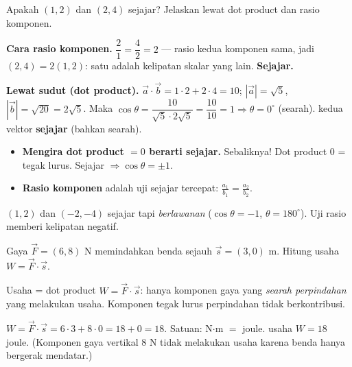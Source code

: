 \begin{soalbox}{}
Apakah $(1,2)$ dan $(2,4)$ sejajar? Jelaskan lewat dot product dan rasio
komponen.
\end{soalbox}

\jawab
\textbf{Cara rasio komponen.} $\dfrac{2}{1}=\dfrac{4}{2}=2$ --- rasio kedua
komponen sama, jadi $(2,4)=2(1,2)$: satu adalah kelipatan skalar yang lain.
\textbf{Sejajar.}

\textbf{Lewat sudut (dot product).} $\vec a\cdot\vec b=1\cdot2+2\cdot4=10$;
$|\vec a|=\sqrt5$, $|\vec b|=\sqrt{20}=2\sqrt5$. Maka
$\cos\theta=\dfrac{10}{\sqrt5\cdot2\sqrt5}=\dfrac{10}{10}=1\Rightarrow\theta=0^\circ$
(searah).
\jadi kedua vektor \textbf{sejajar} (bahkan searah).

\begin{jebakan}
\begin{itemize}[leftmargin=*,topsep=2pt]
  \item \textbf{Mengira dot product $=0$ berarti sejajar.} Sebaliknya! Dot
  product $0$ = tegak lurus. Sejajar $\Rightarrow\cos\theta=\pm1$.
  \item \textbf{Rasio komponen} adalah uji sejajar tercepat: $\frac{a_1}{b_1}
  =\frac{a_2}{b_2}$.
\end{itemize}
\end{jebakan}

\begin{variasi}
$(1,2)$ dan $(-2,-4)$ sejajar tapi \emph{berlawanan} ($\cos\theta=-1$,
$\theta=180^\circ$). Uji rasio memberi kelipatan negatif.
\end{variasi}

\begin{soalbox}{}
Gaya $\vec F=(6,8)$ N memindahkan benda sejauh $\vec s=(3,0)$ m. Hitung usaha
$W=\vec F\cdot\vec s$.
\end{soalbox}

\begin{ingat}{Usaha = dot product}
$W=\vec F\cdot\vec s$: hanya komponen gaya yang \emph{searah perpindahan} yang
melakukan usaha. Komponen tegak lurus perpindahan tidak berkontribusi.
\end{ingat}

\jawab
{} $W=\vec F\cdot\vec s=6\cdot3+8\cdot0=18+0=18$.
 Satuan: N$\cdot$m $=$ joule.
\jadi usaha $W=18$ joule. (Komponen gaya vertikal $8$ N tidak melakukan usaha
karena benda hanya bergerak mendatar.)

